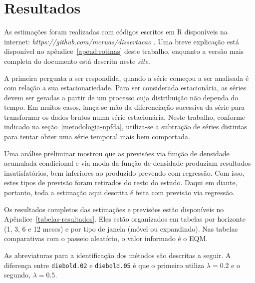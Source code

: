\documentclass[
	12pt,				%
	openright,			%
	oneside,			%
	a4paper,			%
	english,			%
	brazil				%
	]{dissertacao-ufrgs-abntex2}
\begin{document}
\chapter{Resultados} \label{ch:resultados}

As estimações foram realizadas com códigos escritos em R disponíveis na internet: \emph{https://github.com/mcruas/dissertacao} . Uma breve  explicação está 
disponível no apêndice~\ref{apend:rotinas} deste trabalho, enquanto a versão mais completa do documento está descrita neste \emph{site}.

A primeira pergunta a ser respondida, quando a série começou a ser analisada é com relação a sua estacionariedade. Para ser considerada estacionária, as séries devem ser geradas a partir de um processo cuja distribuição não dependa do tempo. Em muitos casos, lança-se mão da diferenciação sucessiva da série para transformar os dados brutos numa série estacionária. Neste trabalho, conforme indicado na seção~\ref{metodologia-npfda}, utiliza-se a subtração de séries distintas para tentar obter uma série temporal mais bem comportada.

Uma análise preliminar mostrou que as previsões via função de densidade acumulada condicional e via moda da função de densidade produziam resultados insatisfatórios, bem inferiores ao produzido prevendo com regressão. Com isso, estes tipos de previsão foram retirados do resto do estudo. Daqui em diante, portanto, toda a estimação aqui descrita é feita com previsão via regressão.

Os resultados completos das estimações e previsões estão disponíveis no Apêndice~\ref{tabelas-resultados}. Eles estão organizados em tabelas por horizonte (1, 3, 6 e 12 meses) e por tipo de janela (móvel ou expandindo). Nas tabelas comparativas com o passeio aleatório, o valor informado é o EQM.

As abreviaturas para a identificação dos métodos são descritas a seguir. A diferença entre \texttt{diebold.02} e \texttt{diebold.05} é que o primeiro utiliza $\lambda=0.2$ e o segundo, $\lambda=0.5$.

\end{document}
